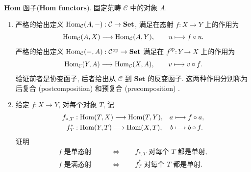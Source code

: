 \documentclass{article}
\newcommand{\op}{^{\mathrm{op}}}
\begin{document}
\begin{problem}
  \textbf{Hom} {\heiti 函子}(\textbf{Hom functors}). 固定范畴 $\mathcal C$ 中的对象 $A$.

  \begin{enumerate}
    \item[(a)] 严格的给出定义 $\operatorname{Hom}_{\mathcal C}(A,-):\mathcal C\to\mathbf{Set}$, 满足在态射 $f:X\to Y$ 上的作用为
      \[
        \operatorname{Hom}_{\mathcal C}(A,X)\longrightarrow\operatorname{Hom}_{\mathcal C}(A,Y),\qquad
        u\longmapsto f\circ u.
      \]
      严格的给出定义 $\Hom_{\mathcal C}(-,A):\mathcal C\op\to\mathbf{Set}$ 满足在 $f\op:Y\to X$ 上的作用为
      \[
        \operatorname{Hom}_{\mathcal C}(Y,A)\longrightarrow\operatorname{Hom}_{\mathcal C}(X,A),\qquad
        v\longmapsto v\circ f.
      \]
      验证前者是协变函子, 后者给出从 $\mathcal C$ 到 $\mathbf{Set}$ 的反变函子. 这两种作用分别称为后复合 (postcomposition) 和预复合 (precomposition) .

    \item[(b)] 给定 $f:X\to Y$, 对每个对象 $T$, 记
      \[
        \begin{aligned}
          f_{*,T}&:\operatorname{Hom}(T,X)\longrightarrow\operatorname{Hom}(T,Y),
          & a&\longmapsto f\circ a,\\
          f_T^*&:\operatorname{Hom}(Y,T)\longrightarrow\operatorname{Hom}(X,T),
          & b&\longmapsto b\circ f.
        \end{aligned}
      \]
      证明
      \[
        \begin{aligned}
          f\text{ 是单态射}&\qquad\Longleftrightarrow\qquad f_{*,T}\text{ 对每个 }T\text{ 都是单射},\\
          f\text{ 是满态射}&\qquad\Longleftrightarrow\qquad f_T^*\text{ 对每个 }T\text{ 都是单射}.
        \end{aligned}
      \]
  \end{enumerate}
\end{problem}
\end{document}
